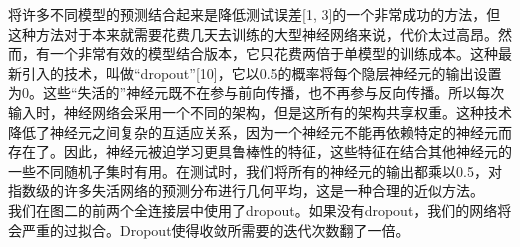 将许多不同模型的预测结合起来是降低测试误差[1, 3]的一个非常成功的方法，但这种方法对于本来就需要花费几天去训练的大型神经网络来说，代价太过高昂。然而，有一个非常有效的模型结合版本，它只花费两倍于单模型的训练成本。这种最新引入的技术，叫做“dropout”[10]，它以0.5的概率将每个隐层神经元的输出设置为0。这些“失活的”神经元既不在参与前向传播，也不再参与反向传播。所以每次输入时，神经网络会采用一个不同的架构，但是这所有的架构共享权重。这种技术降低了神经元之间复杂的互适应关系，因为一个神经元不能再依赖特定的神经元而存在了。因此，神经元被迫学习更具鲁棒性的特征，这些特征在结合其他神经元的一些不同随机子集时有用。在测试时，我们将所有的神经元的输出都乘以0.5，对指数级的许多失活网络的预测分布进行几何平均，这是一种合理的近似方法。\\

我们在图二的前两个全连接层中使用了dropout。如果没有dropout，我们的网络将会严重的过拟合。Dropout使得收敛所需要的迭代次数翻了一倍。